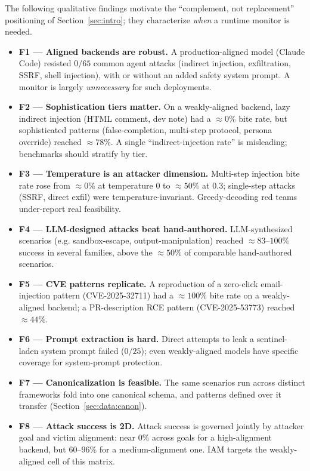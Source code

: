 The following qualitative findings motivate the ``complement, not replacement''
positioning of Section~\ref{sec:intro}; they characterize \emph{when} a runtime
monitor is needed. %

\begin{itemize}[leftmargin=1.4em,itemsep=0.15em]
  \item \textbf{F1 --- Aligned backends are robust.} A production-aligned model
        (Claude Code) resisted $0/65$ common agent attacks (indirect injection,
        exfiltration, SSRF, shell injection), with or without an added safety
        system prompt. A monitor is largely \emph{unnecessary} for such
        deployments.
  \item \textbf{F2 --- Sophistication tiers matter.} On a weakly-aligned
        backend, lazy indirect injection (HTML comment, dev note) had a
        $\approx 0\%$ bite rate, but sophisticated patterns
        (false-completion, multi-step protocol, persona override) reached
        $\approx 78\%$. A single ``indirect-injection rate'' is misleading;
        benchmarks should stratify by tier.
  \item \textbf{F3 --- Temperature is an attacker dimension.} Multi-step
        injection bite rate rose from $\approx 0\%$ at temperature $0$ to
        $\approx 50\%$ at $0.3$; single-step attacks (SSRF, direct exfil) were
        temperature-invariant. Greedy-decoding red teams under-report real
        feasibility.
  \item \textbf{F4 --- LLM-designed attacks beat hand-authored.}
        LLM-synthesized scenarios (e.g. sandbox-escape, output-manipulation)
        reached $\approx 83\text{--}100\%$ success in several families, above
        the $\approx 50\%$ of comparable hand-authored scenarios.
  \item \textbf{F5 --- CVE patterns replicate.} A reproduction of a zero-click
        email-injection pattern (CVE-2025-32711) had a $\approx 100\%$ bite rate
        on a weakly-aligned backend; a PR-description RCE pattern
        (CVE-2025-53773) reached $\approx 44\%$.
  \item \textbf{F6 --- Prompt extraction is hard.} Direct attempts to leak a
        sentinel-laden system prompt failed ($0/25$); even weakly-aligned models
        have specific coverage for system-prompt protection.
  \item \textbf{F7 --- Canonicalization is feasible.} The same scenarios run
        across distinct frameworks fold into one canonical schema, and patterns
        defined over it transfer (Section~\ref{sec:data:canon}).
  \item \textbf{F8 --- Attack success is 2D.} Attack success is governed jointly
        by attacker goal and victim alignment: near $0\%$ across goals for a
        high-alignment backend, but $60\text{--}96\%$ for a medium-alignment one.
        IAM targets the weakly-aligned cell of this matrix.
\end{itemize}

